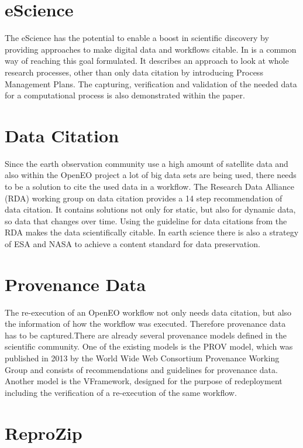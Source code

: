 \documentclass[draft,final]{vutinfth} %
\begin{document}
\section{eScience}
The eScience has the potential to enable a boost in scientific discovery by providing approaches to make digital data and workflows citable. In \cite{Rauber2015RepeatabilityAR} is a common way of reaching this goal formulated. It describes an approach to look at whole research processes, other than only data citation by introducing Process Management Plans. The capturing, verification and validation of the needed data for a computational process is also demonstrated within the paper.\cite{Rauber2015RepeatabilityAR}

\section{Data Citation}
Since the earth observation community use a high amount of satellite data and also within the OpenEO project a lot of big data sets are being used, there needs to be a solution to cite the used data in a workflow. The Research Data Alliance (RDA) working group on data citation provides a 14 step recommendation of data citation. It contains solutions not only for static, but also for dynamic data, so data that changes over time. Using the guideline for data citations from the RDA makes the data scientifically citable. \cite{rauber2016identification} 
In earth science there is also a strategy of ESA and NASA to achieve a content standard for data preservation.\cite{6352411}

\section{Provenance Data}
The re-execution of an OpenEO workflow not only needs data citation, but also the information of how the workflow was executed. Therefore provenance data has to be captured.\cite{Roure11towardsthe}There are already several provenance models defined in the scientific community. One of the existing models is the PROV model, which was published in 2013 by the World Wide Web Consortium Provenance Working Group and consists of recommendations and guidelines for provenance data.\cite{MOREAU2015235} 
Another model is the VFramework, designed for the purpose of redeployment including the verification of a re-execution of the same workflow. \cite{DBLP:conf/ipres/MiksaPMSVBR13}

\section{ReproZip}
\end{document}
